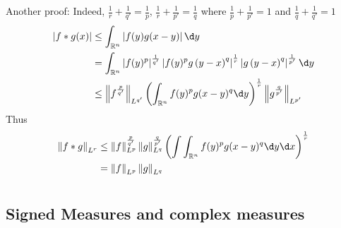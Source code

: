 \documentclass[12pt, a4paper, oneside]{book}
\begin{document}
\begin{theorem}[Young's]
    Another proof:
    Indeed, $\frac{1}{r}+ \frac{1}{q'}=\frac{1}{p}$, $\frac{1}{r}+ \frac{1}{p'}=\frac{1}{q}$ where $\frac{1}{p}+\frac{1}{p'}=1$ and $\frac{1}{q}+\frac{1}{q'}=1$
    \begin{equation*}
        \begin{aligned}
            \left|f*g(x) \right|
             & \leq
            \int_{\mathbb{R}^n} \left|f(y) g(x-y)\right| \d y                 \\
             & =\int_{\mathbb{R}^n}\left|f(y)^p\right|^{\frac{1}{q^{\prime}}}
            \left|f(y)^p g\left(y-x\right)^q\right|^{\frac{1}{r}}
            \left|g\left(y -x\right)^q\right|^{\frac{1}{p^{\prime}}}  \d y    \\
             & \leq \left\| f^{\frac{p}{q'}}\right\|_{L^{q'}}
            \left(\int_{\mathbb{R}^n} f(y)^p g(x-y)^q \d y\right)^{\frac{1}{r}}
            \left\|g^{\frac{q}{p'}}\right\|_{L^{p'}}
        \end{aligned}
    \end{equation*}
    Thus
    \begin{equation*}
        \begin{aligned}
            \left\|f*g\right\|_{L^r} & \leq \left\| f\right\|_{L^p}^{\frac{p}{q'}} \left\| g\right\|_{L^q}^{\frac{q}{p'}}
            \left(\int \int_{\mathbb{R}^n} f(y)^p g(x-y)^q \d y \d x\right)^{\frac{1}{r}}                                 \\
                                     & = \left\| f\right\|_{L^p}
            \left\| g\right\|_{L^q}
        \end{aligned}
    \end{equation*}
\end{theorem}


\chapter{}
\section{Signed Measures and complex measures}
\end{document}
